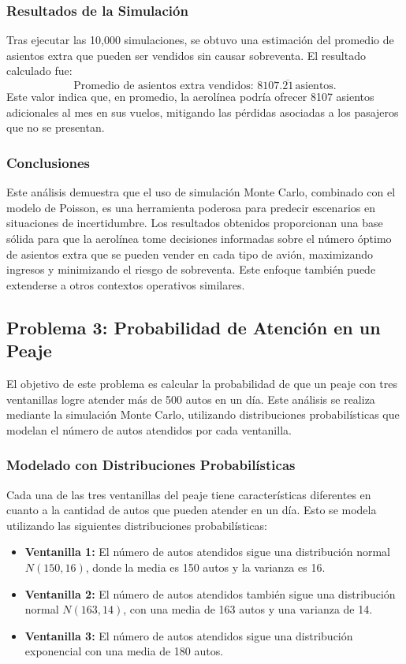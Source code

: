 \documentclass[12pt]{article}
\begin{document}
\subsubsection{Resultados de la Simulación}
Tras ejecutar las 10,000 simulaciones, se obtuvo una estimación del promedio de asientos extra que pueden ser vendidos sin causar sobreventa. El resultado calculado fue:
\[
\text{Promedio de asientos extra vendidos: } 8107.\overline{21} \, \text{asientos.}
\]
Este valor indica que, en promedio, la aerolínea podría ofrecer \num{8107} asientos adicionales al mes en sus vuelos, mitigando las pérdidas asociadas a los pasajeros que no se presentan.

\subsubsection*{Conclusiones}
Este análisis demuestra que el uso de simulación Monte Carlo, combinado con el modelo de Poisson, es una herramienta poderosa para predecir escenarios en situaciones de incertidumbre. Los resultados obtenidos proporcionan una base sólida para que la aerolínea tome decisiones informadas sobre el número óptimo de asientos extra que se pueden vender en cada tipo de avión, maximizando ingresos y minimizando el riesgo de sobreventa. Este enfoque también puede extenderse a otros contextos operativos similares.


\subsection{Problema 3: Probabilidad de Atención en un Peaje}
El objetivo de este problema es calcular la probabilidad de que un peaje con tres ventanillas logre atender más de 500 autos en un día. Este análisis se realiza mediante la simulación Monte Carlo, utilizando distribuciones probabilísticas que modelan el número de autos atendidos por cada ventanilla.

\subsubsection{Modelado con Distribuciones Probabilísticas}
Cada una de las tres ventanillas del peaje tiene características diferentes en cuanto a la cantidad de autos que pueden atender en un día. Esto se modela utilizando las siguientes distribuciones probabilísticas:
\begin{itemize}
    \item \textbf{Ventanilla 1:} El número de autos atendidos sigue una distribución normal $N(150, 16)$, donde la media es 150 autos y la varianza es 16.
    \item \textbf{Ventanilla 2:} El número de autos atendidos también sigue una distribución normal $N(163, 14)$, con una media de 163 autos y una varianza de 14.
    \item \textbf{Ventanilla 3:} El número de autos atendidos sigue una distribución exponencial con una media de 180 autos.
\end{itemize}
\end{document}

